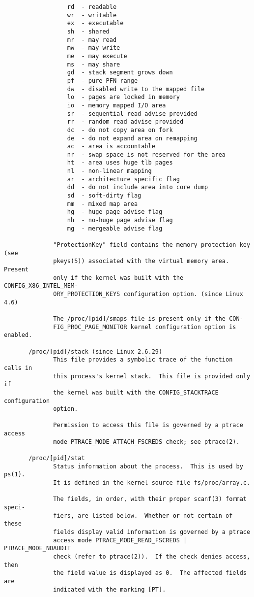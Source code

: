 \documentclass[]{article}
\begin{document}
\begin{verbatim}
                  rd  - readable
                  wr  - writable
                  ex  - executable
                  sh  - shared
                  mr  - may read
                  mw  - may write
                  me  - may execute
                  ms  - may share
                  gd  - stack segment grows down
                  pf  - pure PFN range
                  dw  - disabled write to the mapped file
                  lo  - pages are locked in memory
                  io  - memory mapped I/O area
                  sr  - sequential read advise provided
                  rr  - random read advise provided
                  dc  - do not copy area on fork
                  de  - do not expand area on remapping
                  ac  - area is accountable
                  nr  - swap space is not reserved for the area
                  ht  - area uses huge tlb pages
                  nl  - non-linear mapping
                  ar  - architecture specific flag
                  dd  - do not include area into core dump
                  sd  - soft-dirty flag
                  mm  - mixed map area
                  hg  - huge page advise flag
                  nh  - no-huge page advise flag
                  mg  - mergeable advise flag

              "ProtectionKey" field contains the memory protection key (see
              pkeys(5)) associated with the virtual memory area.  Present
              only if the kernel was built with the CONFIG_X86_INTEL_MEM‐
              ORY_PROTECTION_KEYS configuration option. (since Linux 4.6)

              The /proc/[pid]/smaps file is present only if the CON‐
              FIG_PROC_PAGE_MONITOR kernel configuration option is enabled.

       /proc/[pid]/stack (since Linux 2.6.29)
              This file provides a symbolic trace of the function calls in
              this process's kernel stack.  This file is provided only if
              the kernel was built with the CONFIG_STACKTRACE configuration
              option.

              Permission to access this file is governed by a ptrace access
              mode PTRACE_MODE_ATTACH_FSCREDS check; see ptrace(2).

       /proc/[pid]/stat
              Status information about the process.  This is used by ps(1).
              It is defined in the kernel source file fs/proc/array.c.

              The fields, in order, with their proper scanf(3) format speci‐
              fiers, are listed below.  Whether or not certain of these
              fields display valid information is governed by a ptrace
              access mode PTRACE_MODE_READ_FSCREDS | PTRACE_MODE_NOAUDIT
              check (refer to ptrace(2)).  If the check denies access, then
              the field value is displayed as 0.  The affected fields are
              indicated with the marking [PT].


\end{verbatim}
\end{document}
